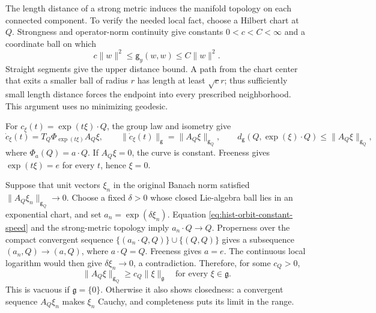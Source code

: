 The length distance of a strong metric induces the manifold topology on
each connected component. To verify the needed local fact, choose a Hilbert
chart at \(Q\). Strongness and operator-norm continuity give constants
\(0<c<C<\infty\) and a coordinate ball on which
\begin{equation}
c\|w\|^2\leq\mathsf g_y(w,w)\leq C\|w\|^2.
\label{eq:hist-strong-chart-bounds}
\end{equation}
Straight segments give the upper distance bound. A path from the chart
center that exits a smaller ball of radius \(r\) has length at least
\(\sqrt c r\); thus sufficiently small length distance forces the endpoint
into every prescribed neighborhood. This argument uses no minimizing
geodesic.

For \(c_\xi(t)=\exp(t\xi)\cdot Q\), the group law and isometry give
\begin{equation}
\dot c_\xi(t)=T_Q\Phi_{\exp(t\xi)}A_Q\xi,
\qquad
\|\dot c_\xi(t)\|_{\mathsf g}=\|A_Q\xi\|_{\mathsf g_Q},
\qquad
d_{\mathsf g}(Q,\exp(\xi)\cdot Q)\leq\|A_Q\xi\|_{\mathsf g_Q},
\label{eq:hist-orbit-constant-speed}
\end{equation}
where \(\Phi_a(Q)=a\cdot Q\). If \(A_Q\xi=0\), the curve is constant.
Freeness gives \(\exp(t\xi)=e\) for every \(t\), hence \(\xi=0\).

Suppose that unit vectors \(\xi_n\) in the original Banach norm satisfied
\(\|A_Q\xi_n\|_{\mathsf g_Q}\to0\). Choose a fixed \(\delta>0\) whose closed
Lie-algebra ball lies in an exponential chart, and set
\(a_n=\exp(\delta\xi_n)\). Equation
\eqref{eq:hist-orbit-constant-speed} and the strong-metric topology imply
\(a_n\cdot Q\to Q\). Properness over the compact convergent sequence
\(\{(a_n\cdot Q,Q)\}\cup\{(Q,Q)\}\) gives a subsequence
\((a_n,Q)\to(a,Q)\), where \(a\cdot Q=Q\). Freeness gives \(a=e\).
The continuous local logarithm would then give \(\delta\xi_n\to0\), a
contradiction. Therefore, for some \(c_Q>0\),
\begin{equation}
\|A_Q\xi\|_{\mathsf g_Q}\geq c_Q\|\xi\|_{\mathfrak g}
\quad\text{for every }\xi\in\mathfrak g.
\label{eq:hist-orbit-coercivity}
\end{equation}
This is vacuous if \(\mathfrak g=\{0\}\). Otherwise it also shows closedness:
a convergent sequence \(A_Q\xi_n\) makes \(\xi_n\) Cauchy, and completeness
puts its limit in the range.

